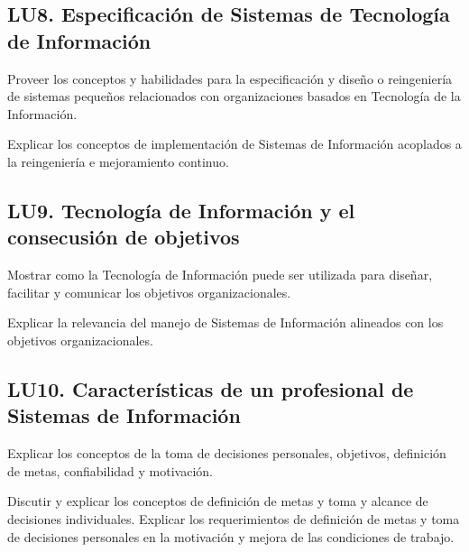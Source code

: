 \subsection{LU8. Especificación de Sistemas de Tecnología de Información}\label{sec:BOK-LU8}\label{sec:LU8}
\begin{LearningUnit}
\begin{LUGoal}
\item Proveer los conceptos y habilidades para la especificación y diseño o reingeniería de sistemas pequeños relacionados con organizaciones basados en Tecnología de la Información.
\end{LUGoal}

\begin{LUObjective}
\item Explicar los conceptos de implementación de Sistemas de Información acoplados a la reingeniería e mejoramiento continuo.
\end{LUObjective}
\end{LearningUnit}

\subsection{LU9. Tecnología de Información y el consecusión de objetivos}\label{sec:BOK-LU9}\label{sec:LU9}
\begin{LearningUnit}
\begin{LUGoal}
\item Mostrar como la Tecnología de Información puede ser utilizada para diseñar, facilitar y comunicar los objetivos organizacionales.
\end{LUGoal}

\begin{LUObjective}
\item Explicar la relevancia del manejo de Sistemas de Información alineados con los objetivos organizacionales.
\end{LUObjective}
\end{LearningUnit}

\subsection{LU10. Características de un profesional de Sistemas de Información}\label{sec:BOK-LU10}\label{sec:LU10}
\begin{LearningUnit}
\begin{LUGoal}
\item Explicar los conceptos de la toma de decisiones personales, objetivos, definición de metas, confiabilidad y motivación.
\end{LUGoal}

\begin{LUObjective}
\item Discutir y explicar los conceptos de definición de metas y toma y alcance de decisiones individuales. Explicar los requerimientos de definición de metas y toma de decisiones personales en la motivación y mejora de las condiciones de trabajo.
\end{LUObjective}
\end{LearningUnit}

